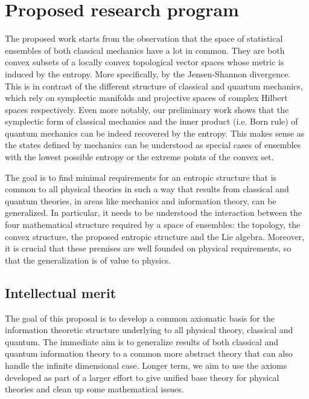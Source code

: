 \section{Proposed research program}

The proposed work starts from the observation that the space of statistical ensembles of both classical mechanics have a lot in common. They are both convex subsets of a locally convex topological vector spaces whose metric is induced by the entropy. More specifically, by the Jensen-Shannon divergence. This is in contrast of the different structure of classical and quantum mechanics, which rely on symplectic manifolds and projective spaces of complex Hilbert spaces respectively. Even more notably, our preliminary work shows that the symplectic form of classical mechanics and the inner product (i.e. Born rule) of quantum mechanics can be indeed recovered by the entropy. This makes sense as the states defined by mechanics can be understood as special cases of ensembles with the lowest possible entropy or the extreme points of the convex set.

The goal is to find minimal requirements for an entropic structure that is common to all physical theories in such a way that results from classical and quantum theories, in areas like mechanics and information theory, can be generalized. In particular, it needs to be understood the interaction between the four mathematical structure required by a space of ensembles: the topology, the convex structure, the proposed entropic structure and the Lie algebra. Moreover, it is crucial that these premises are well founded on physical requirements, so that the generalization is of value to physics.



\subsection{Intellectual merit}

The goal of this proposal is to develop a common axiomatic basis for the information theoretic structure underlying to all physical theory, classical and quantum. The immediate aim is to generalize results of both classical and quantum information theory to a common more abstract theory that can also handle the infinite dimensional case. Longer term, we aim to use the axioms developed as part of a larger effort to give unified base theory for physical theories and clean up some mathematical issues.

